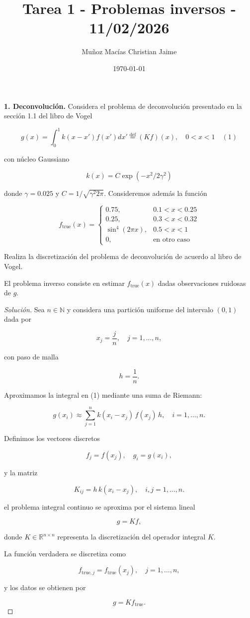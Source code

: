 \documentclass[12pt,spanish,mexico]{article}
\title{Tarea 1 - Problemas inversos - 11/02/2026}
\author{Muñoz Macías Christian Jaime}
\date{\today}
\numberwithin{equation}{section}
\theoremstyle{definition}
\theoremstyle{remark}
\newenvironment{solution}{\begin{proof}[Solución]}{\end{proof}}
\begin{document}
\maketitle

\textbf{1. Deconvolución.} Considera el problema de deconvolución presentado en la sección 1.1 del libro de Vogel

\[
g(x) = \int_{0}^{1} k(x - x') f(x') dx' \stackrel{\text{def}}{=} (Kf)(x), \quad 0 < x < 1 \quad (1)
\]

con núcleo Gaussiano

\[
k(x) = C \exp(-x^2/2\gamma^2)
\]

donde \(\gamma = 0.025\) y \(C = 1/\sqrt{\gamma^2 2\pi}\). Consideremos además la función

\[
f_{\text{true}}(x) = 
\begin{cases} 
0.75, & 0.1 < x < 0.25 \\
0.25, & 0.3 < x < 0.32 \\
\sin^4(2\pi x), & 0.5 < x < 1 \\
0, & \text{en otro caso}
\end{cases}
\]

Realiza la discretización del problema de deconvolución de acuerdo al libro de Vogel.

El problema inverso consiste en estimar \( f_{\text{true}} (x) \) dadas observaciones ruidosas de \( g \).

\begin{solution}

Sea $n \in \mathbb{N}$ y considera una partición uniforme del intervalo $(0,1)$ dada por

\[
x_j = \frac{j}{n}, \quad j=1,\dots,n,
\]

con paso de malla

\[
h = \frac{1}{n}.
\]

Aproximamos la integral en (1) mediante una suma de Riemann:

\[
g(x_i)
\approx
\sum_{j=1}^{n}
k(x_i - x_j)\, f(x_j)\, h,
\quad i=1,\dots,n.
\]

Definimos los vectores discretos

\[
f_j = f(x_j), \quad g_i = g(x_i),
\]

y la matriz

\[
K_{ij} = h\, k(x_i - x_j),
\quad i,j=1,\dots,n.
\]

el problema integral continuo se aproxima por el sistema lineal

\[
g = K f,
\]

donde $K \in \mathbb{R}^{n \times n}$ representa la discretización del operador integral $K$.

La función verdadera se discretiza como

\[
f_{\text{true},j}
=
f_{\text{true}}(x_j),
\quad j=1,\dots,n,
\]

y los datos se obtienen por

\[
g = K f_{\text{true}}.
\]


\end{solution}
\end{document}
